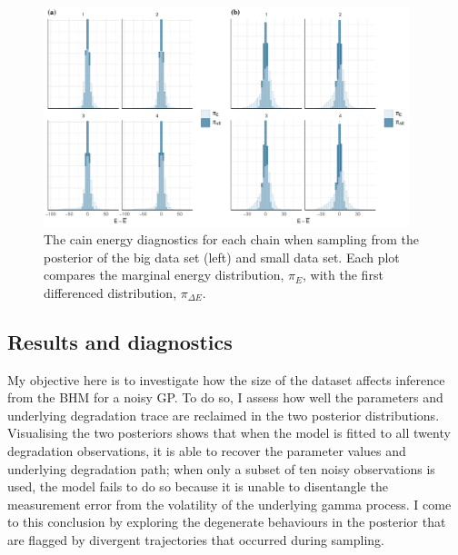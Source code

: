 \begin{figure}
  \centering
  \includegraphics[width=0.95\textwidth]{./figures/ch-4/nuts_energy.pdf}
  \caption{The cain energy diagnostics for each chain when sampling from the posterior of the big data set (left) and small data set. Each plot compares the marginal energy distribution, $\pi_E$, with the first differenced distribution, $\pi_{\Delta E}$.}
  \label{fig:nuts-energies}
\end{figure}

\subsection{Results and diagnostics} \label{sec:noisy-GP-results}

My objective here is to investigate how the size of the dataset affects inference from the BHM for a noisy GP. To do so, I assess how well the parameters and underlying degradation trace are reclaimed in the two posterior distributions. Visualising the two posteriors shows that when the model is fitted to all twenty degradation observations, it is able to recover the parameter values and underlying degradation path; when only a subset of ten noisy observations is used, the model fails to do so because it is unable to disentangle the measurement error from the volatility of the underlying gamma process. I come to this conclusion by exploring the degenerate behaviours in the posterior that are flagged by divergent trajectories that occurred during sampling. 

